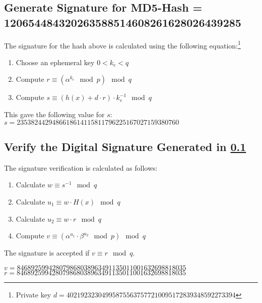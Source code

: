 \documentclass{article}
\begin{document}
\subsection {Generate Signature for MD5-Hash = 120654484320263588514608261628026439285}
\label{sec:sig}
The signature for the hash above is calculated using the following equation:\footnote{Private key $d = 402192323049958755637577210095172839348592273394$ }
\begin{enumerate}
    \item Choose an ephemeral key $0 < k_e < q$
    \item Compute $r \equiv (\alpha ^{k_e} \mod p) \mod q$
    \item Compute $s \equiv (h(x) + d \cdot r) \cdot k_e ^{-1} \mod q$
\end{enumerate}
This gave the following value for $s$:\newline
$ s = 2353824429486618614115811796225167027159380760 $

\subsection {Verify the Digital Signature Generated in \ref{sec:sig}}

The signature verification is calculated as follows:
\begin{enumerate}
    \item Calculate $w \equiv s^{-1} \mod q$
    \item Calculate $u_1 \equiv w \cdot H(x) \mod q$
    \item Calculate $u_2 \equiv w \cdot r \mod q$
    \item Compute $v \equiv (\alpha ^{u_1} \cdot \beta^{u_2} \mod p) \mod q$
\end{enumerate}
The signature is accepted if $v \equiv r \mod q$.

$v =  846892599428079868038963491135011001632698818035$ \newline
$ r = 846892599428079868038963491135011001632698818035 $
\end{document}
